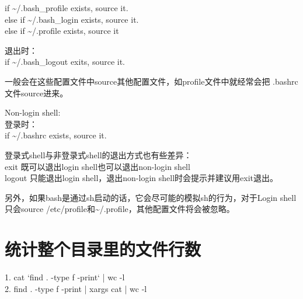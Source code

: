 ﻿\documentclass[a4paper,11pt]{article}
\begin{document}
  if \~{}/.bash\_profile exists, source it.\\
  else if \~{}/.bash\_login exists, source it.\\
  else if \~{}/.profile exists, source it

  退出时：\\
  if \~{}/.bash\_logout exits, source it.

  一般会在这些配置文件中source其他配置文件，如profile文件中就经常会把
  .bashrc文件source进来。

  Non-login shell:\\
  登录时：\\
  if \~{}/.bashrc exists, source it.

  登录式shell与非登录式shell的退出方式也有些差异：\\
  exit 既可以退出login shell也可以退出non-login shell\\
  logout 只能退出login shell，退出non-login shell时会提示并建议用exit退出。

  另外，如果bash是通过sh启动的话，它会尽可能的模拟sh的行为，对于Login shell
  只会source /etc/profile和\~{}/.profile，其他配置文件将会被忽略。


  \section[统计整个目录里的文件行数]{统计整个目录里的文件行数}
  1. cat `find . -type f -print` | wc -l\\
  2. find . -type f -print | xargs cat | wc -l\\
\end{document}
